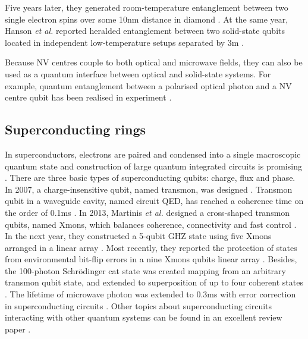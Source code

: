 Five years later, they generated room-temperature entanglement between two single electron spins over some 10nm distance in diamond \cite{bib:dolde2013room}. At the same year, Hanson \textit{et al.} reported heralded entanglement between two solid-state qubits located in independent low-temperature setups separated by 3m \cite{bib:bernien2013heralded}.

Because NV centres couple to both optical and microwave fields, they can also be used as a quantum interface between optical and solid-state systems. For example, quantum entanglement between a polarised optical photon and a NV centre qubit has been realised in experiment \cite{bib:togan2010quantum}.

%
%

\subsection{Superconducting rings} 

In superconductors, electrons are paired and condensed into a single macroscopic quantum state and construction of large quantum integrated circuits is promising \cite{bib:devoret2013superconducting}. There are three basic types of superconducting qubits: charge, flux and phase. In 2007, a charge-insensitive qubit, named transmon, was designed \cite{bib:koch2007charge}. Transmon qubit in a waveguide cavity, named circuit QED, has reached a coherence time on the order of 0.1ms \cite{bib:paik2011observation, bib:rigetti2012superconducting}. In 2013, Martinis \textit{et al.} designed a cross-shaped transmon qubits, named Xmons, which balances coherence, connectivity and fast control \cite{bib:barends2013coherent}. In the next year, they constructed a 5-qubit GHZ state using five Xmons arranged in a linear array \cite{bib:barends2014superconducting}. Most recently, they reported the protection of states from environmental bit-flip errors in a nine Xmons qubits linear array \cite{bib:kelly2015state}. Besides, the 100-photon Schr{\"o}dinger cat state was created mapping from an arbitrary transmon qubit state, and extended to superposition of up to four coherent states \cite{bib:vlastakis2013deterministically}. The lifetime of microwave photon was extended to 0.3ms with error correction in superconducting circuits \cite{bib:ofek2016extending}. Other topics about superconducting circuits interacting with other quantum systems can be found in an excellent review paper \cite{bib:xiang2013hybrid}.

